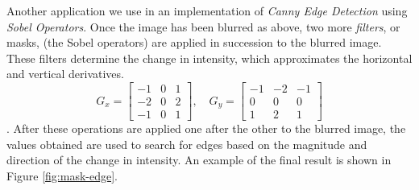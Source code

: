 \documentclass[addpoints]{exam}
\begin{document}
Another application we use in an implementation of \textit{Canny Edge Detection} using \textit{Sobel Operators}. Once the image has been blurred as above, two more \textit{filters}, or masks, (the Sobel operators) are applied in succession to the blurred image. These filters determine the change in intensity, which approximates the horizontal and vertical derivatives.
\[
  G_x =   \left[
    \begin{array}{ccc}
      -1 & 0 & 1\\
      -2 & 0 & 2\\
      -1 & 0 & 1
    \end{array}
      \right], \quad
  G_y =   \left[
    \begin{array}{ccc}
      -1 & -2 & -1\\
      0 & 0 & 0\\
      1 & 2 & 1
    \end{array}    
  \right]
\]
. After these operations are applied one after the other to the blurred image, the values obtained are used to search for edges based on the magnitude and direction of the change in intensity. An example of the final result is shown in Figure \ref{fig:mask-edge}.
\end{document}
